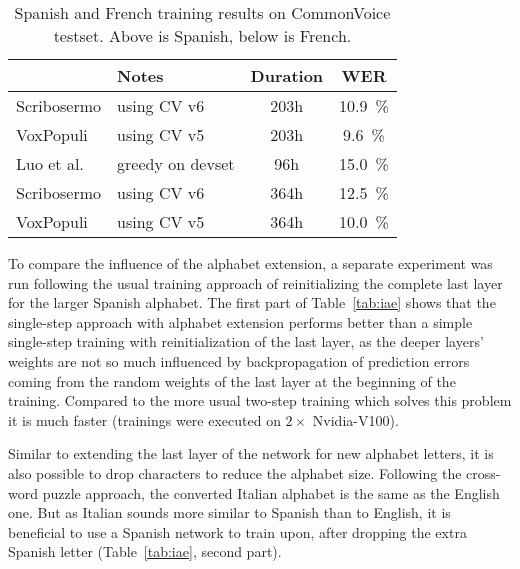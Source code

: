 \begin{table}[!htbp]
	\caption{Spanish and French training results on CommonVoice testset. Above is Spanish, below is French.}
	\label{tab:rqnef}
	\centering
	\begin{tabular}{llcc}
		\toprule
		\textbf{}  & \textbf{Notes}  & \textbf{Duration} & \textbf{WER} \\
		\midrule
		Scribosermo & using CV v6 & 203h  & \SI{10.9}{\percent} \\
		VoxPopuli \cite{VOXPOP} & using CV v5 & 203h & \SI{9.6}{\percent} \\
		Luo et al. \cite{QNTECR} & greedy on devset & 96h &
		\SI{15.0}{\percent} \\
		\midrule
		Scribosermo & using CV v6 & 364h & \SI{12.5}{\percent} \\
		VoxPopuli \cite{VOXPOP} & using CV v5 & 364h & \SI{10.0}{\percent} \\
		\bottomrule
	\end{tabular}
\end{table}

\vspace{9pt}
To compare the influence of the alphabet extension, a separate experiment was run following the usual training approach of reinitializing the complete last layer for the larger Spanish alphabet. The first part of Table~\ref{tab:iae} shows that the single-step approach with alphabet extension performs better than a simple single-step training with reinitialization of the last layer, as the deeper layers' weights are not so much influenced by backpropagation of prediction errors coming from the random weights of the last layer at the beginning of the training. Compared to the more usual two-step training which solves this problem it is much faster (trainings were executed on $2\times$ Nvidia-V100). 

Similar to extending the last layer of the network for new alphabet letters, it is also possible to drop characters to reduce the alphabet size. Following the cross-word puzzle approach, the converted Italian alphabet is the same as the English one. But as Italian sounds more similar to Spanish than to English, it is beneficial to use a Spanish network to train upon, after dropping the extra Spanish letter (Table~\ref{tab:iae}, second part).


